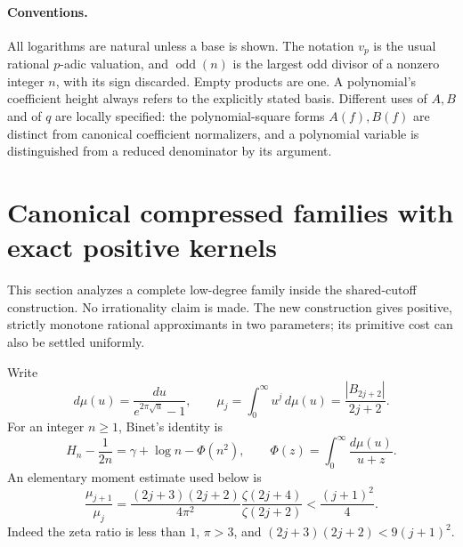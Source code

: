 \documentclass[11pt,a4paper]{article}
\theoremstyle{definition}
\theoremstyle{remark}
\begin{document}
\paragraph{Conventions.}
All logarithms are natural unless a base is shown. The notation
\(v_p\) is the usual rational \(p\)-adic valuation, and
\(\operatorname{odd}(n)\) is the largest odd divisor of a nonzero integer
\(n\), with its sign discarded. Empty products are one. A polynomial's
coefficient height always refers to the explicitly stated basis.
Different uses of \(A,B\) and of \(q\) are locally specified: the
polynomial-square forms \(A(f),B(f)\) are distinct from canonical
coefficient normalizers, and a polynomial variable is distinguished
from a reduced denominator by its argument.

\section{Canonical compressed families with exact positive kernels}
\label{next-cutoff-section}

This section analyzes a complete low-degree family inside the shared-cutoff
construction. No irrationality claim is made. The new construction gives
positive, strictly monotone rational approximants in two parameters; its
primitive cost can also be settled uniformly.

Write
\[
 d\mu(u)=\frac{du}{e^{2\pi\sqrt u}-1},\qquad
 \mu_j=\int_0^\infty u^j\,d\mu(u)
       =\frac{|B_{2j+2}|}{2j+2}.
\]
For an integer $n\ge1$, Binet's identity \cite{dlmf-binet} is
\[
 H_n-\frac1{2n}=\gamma+\log n-\Phi(n^2),
 \qquad \Phi(z)=\int_0^\infty\frac{d\mu(u)}{u+z}.
\]
An elementary moment estimate used below is
\begin{equation}\label{next-cutoff-moment-ratio}
 \frac{\mu_{j+1}}{\mu_j}
 =\frac{(2j+3)(2j+2)}{4\pi^2}
   \frac{\zeta(2j+4)}{\zeta(2j+2)}
 <\frac{(j+1)^2}{4}.
\end{equation}
Indeed the zeta ratio is less than $1$, $\pi>3$, and
$(2j+3)(2j+2)<9(j+1)^2$.
\end{document}
